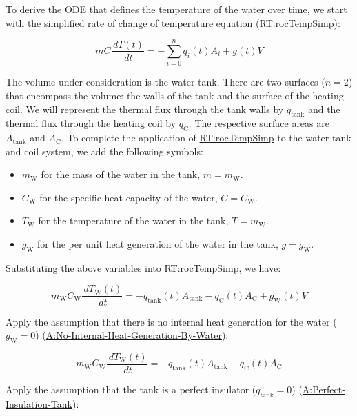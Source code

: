 \documentclass[12pt]{article}
\begin{document}
To derive the ODE that defines the temperature of the water over time, we start
with the simplified rate of change of temperature equation
(\hyperref[RT:rocTempSimp]{RT:rocTempSimp}):

\begin{displaymath}
m C \frac{\,dT(t)}{\,dt} = -\sum_{i=0}^n {q_i(t)} {A_i} + g(t) V
\end{displaymath}

The volume under consideration is the water tank.  There are two surfaces
($n=2$) that encompass the volume: the walls of the tank and the surface of the
heating coil.  We will represent the thermal flux through the tank walls by
$q_\text{tank}$ and the thermal flux through the heating coil by $q_\text{C}$.
The respective surface areas are $A_\text{tank}$ and $A_\text{C}$. To complete
the application of \hyperref[RT:rocTempSimp]{RT:rocTempSimp} to the water tank
and coil system, we add the following symbols: 

\begin{itemize}
\item $m_\text{W}$ for the mass of the water in the tank, $m = m_\text{W}$.
\item $C_\text{W}$ for the specific heat capacity of the water, $C =
C_\text{W}$.
\item $T_\text{W}$ for the temperature of the water in the tank, $T =
m_\text{W}$.
\item $g_\text{W}$ for the per unit heat generation of the water in the tank, $g
= g_\text{W}$.
\end{itemize}

Substituting the above variables into \hyperref[RT:rocTempSimp]{RT:rocTempSimp}, we have:

\begin{displaymath}
m_\text{W} C_\text{W} \frac{\,dT_\text{W}(t)}{\,dt} = -{q_\text{tank}(t)} {A_\text{tank}} -{q_\text{C}(t)} {A_\text{C}} + g_\text{W}(t) V
\end{displaymath}

Apply the assumption that there is no internal heat generation for the water
($g_\text{W} = 0$) (\hyperref[assumpNIHGBW]{A:No-Internal-Heat-Generation-By-Water}):

\begin{displaymath}
m_\text{W} C_\text{W} \frac{\,dT_\text{W}(t)}{\,dt} = -{q_\text{tank}(t)} {A_\text{tank}} -{q_\text{C}(t)} {A_\text{C}}
\end{displaymath}

Apply the assumption that the tank is a perfect insulator ($q_\text{tank}=0$)
(\hyperref[assumpPIT]{A:Perfect-Insulation-Tank}): 
\end{document}
